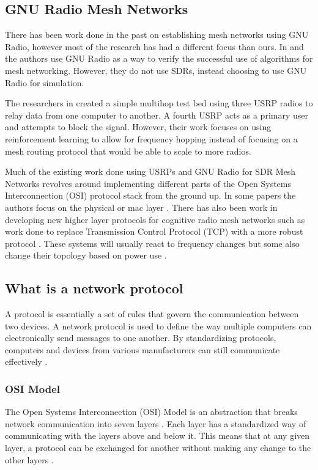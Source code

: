 \subsection{GNU Radio Mesh Networks}

There has been work done in the past on establishing mesh networks using GNU Radio, however most of the research has had a different focus than ours. In \cite{4509617} and \cite{5062250} the authors use GNU Radio as a way to verify the successful use of algorithms for mesh networking. However, they do not use SDRs, instead choosing to use GNU Radio for simulation. 

The researchers in \cite{7141228} created a simple multihop test bed using three USRP radios to relay data from one computer to another. A fourth USRP acts as a primary user and attempts to block the signal. However, their work focuses on using reinforcement learning to allow for frequency hopping instead of focusing on a mesh routing protocol that would be able to scale to more radios. 

Much of the existing work done using USRPs and GNU Radio for SDR Mesh Networks revolves around implementing different parts of the Open Systems Interconnection (OSI) protocol stack from the ground up. In some papers the authors focus on the physical or mac layer \cite{5508221}. There has also been work in developing new higher layer protocols for cognitive radio mesh networks such as work done to replace Transmission Control Protocol (TCP) with a more robust protocol \cite{6686523}. These systems will usually react to frequency changes but some also change their topology based on power use \cite{6983150}.

\subsection{What is a network protocol}

A protocol is essentially a set of rules that govern the communication between two devices. A network protocol is used to define the way multiple computers can electronically send messages to one another. By standardizing protocols, computers and devices from various manufacturers can still communicate effectively \cite{0029}. 

\subsubsection{OSI Model}

The Open Systems Interconnection (OSI) Model is an abstraction that breaks network communication into seven layers \cite{0030}. Each layer has a standardized way of communicating with the layers above and below it. This means that at any given layer, a protocol can be exchanged for another without making any change to the other layers \cite{0031}. 

